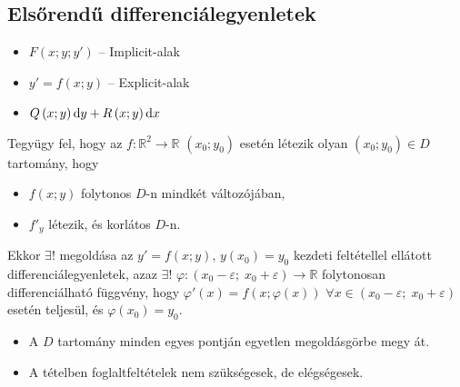 \documentclass[main.tex]{subfiles}
\begin{document}
\subsection{Elsőrendű differenciálegyenletek}

\begin{itemize}
  \item $F \left(x ; y ; y'\right)$
        \tabto{2.5cm} – \tabto{3.1cm}
        Implicit-alak

  \item $y' = f \left(x ; y\right)$
        \tabto{2.5cm} – \tabto{3.1cm}
        Explicit-alak

  \item $Q \left(x ; y\right) \mathrm{d} y
          + R \left(x ; y\right) \mathrm{d} x$
\end{itemize}




Tegyügy fel, hogy az $f: \mathbb{R}^2 \rightarrow \mathbb{R}$
$\left( x_0 ; y_0 \right)$ esetén létezik olyan
$\left( x_0 ; y_0 \right) \in D$ tartomány, hogy
\begin{itemize}
  \item $f(x; y)$ folytonos $D$-n mindkét változójában,
  \item $f'_y$ létezik, és korlátos $D$-n.
\end{itemize}
Ekkor $\exists!$ megoldása az $y' = f(x; y)$, $y(x_0) = y_0$
kezdeti feltétellel ellátott differenciálegyenletek, azaz
$\exists!$ $\varphi :
  \left( x_0 - \varepsilon; \; x_0 + \varepsilon \right)
  \rightarrow \mathbb{R}$ folytonosan differenciálható függvény,
hogy $\varphi' (x) = f \left(x ; \varphi(x)\right)$
$\forall x \in \left( x_0 - \varepsilon; \; x_0 + \varepsilon \right)$
esetén teljesül, és $\varphi(x_0) = y_0$.



\begin{itemize}
  \item A $D$ tartomány minden egyes pontján egyetlen megoldásgörbe megy át.
  \item A tételben foglaltfeltételek nem szükségesek, de elégségesek.
\end{itemize}
\end{document}
